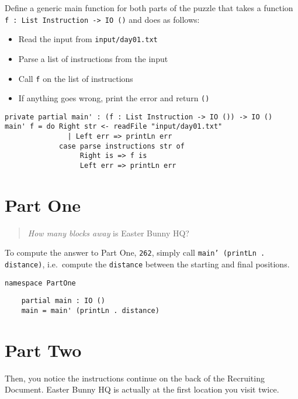 \documentclass[b5paper,twoside]{amsbook}
\providecommand{\tightlist}{%
  \setlength{\itemsep}{0pt}\setlength{\parskip}{0pt}}
\begin{document}
Define a generic main function for both parts of the puzzle that takes a
function \texttt{f : List Instruction -> IO ()} and does as
follows:

\begin{itemize}
\tightlist
\item
  Read the input from \texttt{input/day01.txt}
\item
  Parse a list of instructions from the input
\item
  Call \texttt{f} on the list of instructions
\item
  If anything goes wrong, print the error and return
  \texttt{()}
\end{itemize}

\begin{verbatim}
private partial main' : (f : List Instruction -> IO ()) -> IO ()
main' f = do Right str <- readFile "input/day01.txt"
               | Left err => printLn err
             case parse instructions str of
                  Right is => f is
                  Left err => printLn err
\end{verbatim}

\section{Part One}\label{part-one}

\begin{quote}
  \textit{How many blocks away} is Easter Bunny HQ?
\end{quote}

To compute the answer to Part One, \texttt{262}, simply
call \texttt{main' (printLn . distance)}, i.e.~compute the
\texttt{distance} between the starting and final positions.

\begin{verbatim}
namespace PartOne
\end{verbatim}

\begin{verbatim}
    partial main : IO ()
    main = main' (printLn . distance)
\end{verbatim}

\newpage

\section{Part Two}\label{part-two}

Then, you notice the instructions continue on the back of the Recruiting
Document. Easter Bunny HQ is actually at the first location you visit
twice.
\end{document}
